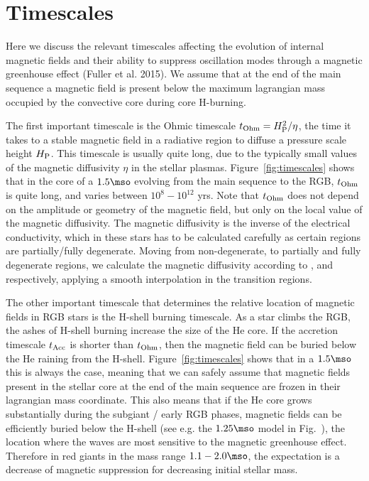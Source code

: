 \section{Timescales}
\label{time}
Here we discuss the relevant timescales affecting the evolution of internal magnetic fields and their ability to 
suppress oscillation modes through a magnetic greenhouse effect (Fuller et al. 2015).
We assume that at the end of the main sequence a magnetic field is present below the maximum lagrangian mass occupied by the convective core during core H-burning.

The first important timescale is the Ohmic timescale $t_{\rm Ohm}= H_{\rm P}^2/\eta$, the time it takes to a stable magnetic field in a radiative region to diffuse a pressure scale height $H_{\rm P}$. This timescale is usually quite long, due to the typically  small values of the magnetic diffusivity $\eta$ in the stellar plasmas. Figure~\ref{fig:timescales} shows that in the core of a $1.5\mso$ evolving from the main sequence to the RGB,  $t_{\rm Ohm}$ is quite long, and varies between $10^8-10^{12}$ yrs. Note that  $t_{\rm Ohm}$ does not depend on the amplitude or geometry of the magnetic field, but only on the local value of the magnetic diffusivity. The magnetic diffusivity is the inverse of the electrical conductivity,  which in these stars has to be calculated carefully as certain regions are partially/fully degenerate. Moving from non-degenerate, to partially and fully degenerate regions, we calculate the magnetic diffusivity according to ,  and  respectively, applying a smooth interpolation in the transition regions.

The other important timescale that determines the relative location of magnetic fields in  RGB stars is the H-shell burning timescale. As a star climbs the RGB, the ashes of H-shell burning increase the size of the He core. If the accretion timescale $t_{\rm Acc}$  is shorter than  $t_{\rm Ohm}$, then the magnetic field can be buried below the He raining from the H-shell. Figure~\ref{fig:timescales} shows that in a $1.5\mso$ this is always the case, meaning that 
we can safely assume that magnetic fields present in the stellar core at the end of the main sequence are frozen in their lagrangian mass coordinate. This also means that if the He core grows substantially during the subgiant / early RGB phases, magnetic fields can be efficiently buried below the H-shell (see e.g. the $1.25\mso$ model in Fig.~\label{fig:DipoleHist}), the location where the waves are most sensitive to the magnetic greenhouse effect. Therefore in red giants in the mass range $1.1-2.0\mso$, the expectation is a decrease of magnetic suppression for decreasing initial stellar mass.

